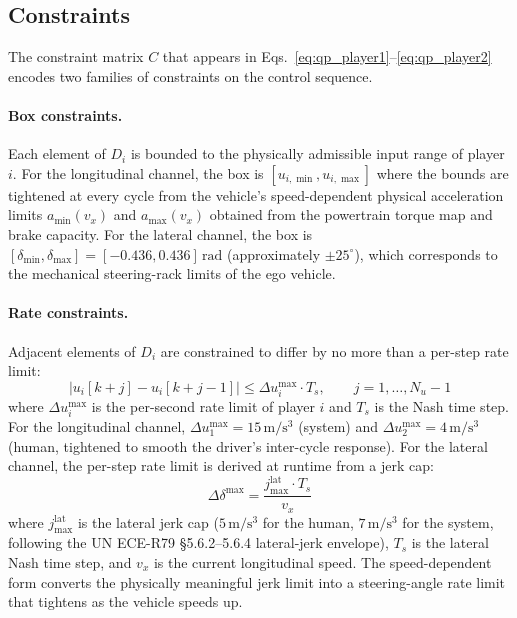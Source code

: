 \documentclass[12pt,a4paper,oneside]{report}
\begin{document}
\subsection{Constraints}
\label{sec:qp_constraints}

The constraint matrix $C$ that appears in Eqs.~\eqref{eq:qp_player1}--\eqref{eq:qp_player2} encodes two families of constraints on the control sequence.

\paragraph{Box constraints.} Each element of $D_i$ is bounded to the physically admissible input range of player $i$. For the longitudinal channel, the box is $[u_{i,\min}, u_{i,\max}]$ where the bounds are tightened at every cycle from the vehicle's speed-dependent physical acceleration limits $a_{\min}(v_x)$ and $a_{\max}(v_x)$ obtained from the powertrain torque map and brake capacity. For the lateral channel, the box is $[\delta_{\min}, \delta_{\max}] = [-0.436, 0.436]\,\mathrm{rad}$ (approximately $\pm 25^\circ$), which corresponds to the mechanical steering-rack limits of the ego vehicle.

\paragraph{Rate constraints.} Adjacent elements of $D_i$ are constrained to differ by no more than a per-step rate limit:
\begin{equation}
\left| u_i[k+j] - u_i[k+j-1] \right| \leq \Delta u_i^{\max} \cdot T_s, \qquad j = 1, \ldots, N_u - 1
\label{eq:rate_constraint}
\end{equation}
where $\Delta u_i^{\max}$ is the per-second rate limit of player $i$ and $T_s$ is the Nash time step. For the longitudinal channel, $\Delta u_1^{\max} = 15\,\mathrm{m/s^3}$ (system) and $\Delta u_2^{\max} = 4\,\mathrm{m/s^3}$ (human, tightened to smooth the driver's inter-cycle response). For the lateral channel, the per-step rate limit is derived at runtime from a jerk cap:
\begin{equation}
\Delta \delta^{\max} = \frac{j^{\text{lat}}_{\max} \cdot T_s}{v_x}
\label{eq:lat_rate_from_jerk}
\end{equation}
where $j^{\text{lat}}_{\max}$ is the lateral jerk cap ($5\,\mathrm{m/s^3}$ for the human, $7\,\mathrm{m/s^3}$ for the system, following the UN ECE-R79 §5.6.2--5.6.4 lateral-jerk envelope), $T_s$ is the lateral Nash time step, and $v_x$ is the current longitudinal speed. The speed-dependent form converts the physically meaningful jerk limit into a steering-angle rate limit that tightens as the vehicle speeds up.
\end{document}
